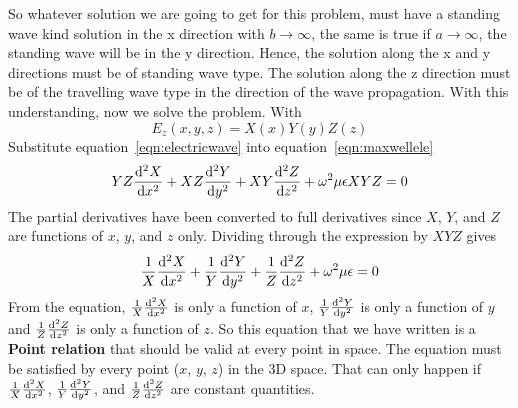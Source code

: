 So whatever solution we are going to get for this problem, must have a standing wave kind solution in the x direction with $b\rightarrow \infty$, the same is true if $a\rightarrow \infty$, the standing wave will be in the y direction. Hence, the solution along the x and y directions must be of standing wave type. The solution along the z direction must be of the travelling wave type in the direction of the wave propagation. With this understanding, now we solve the problem. With
\begin{equation}
E_z (x,y,z) = X(x)Y(y)Z(z)
\label{eqn:electricwave}
\end{equation}
Substitute equation~\ref{eqn:electricwave} into equation~\ref{eqn:maxwellele}
\begin{align}
YZ \dv[2]{X}{x} + XZ \dv[2]{Y}{y} + XY \dv[2]{Z}{z}+ \omega^2\mu\epsilon {XYZ} = 0
\end{align}
The partial derivatives have been converted to full derivatives since $X$, $Y$, and $Z$ are functions of $x$, $y$, and $z$ only. Dividing through the expression by $XYZ$ gives
\begin{align}
\frac{1}{X}\dv[2] {X}{x} + \frac{1}{Y}\dv[2]{Y}{y} + \frac{1}{Z} \dv[2]{Z}{z} + \omega^2\mu\epsilon = 0
\label{eqn:diffeqn}
\end{align}
From the equation, $\frac{1}{X}\dv[2] {X}{x}$ is only a function of $x$, $\frac{1}{Y}\dv[2]{Y}{y}$ is only a function of $y$ and $\frac{1}{Z} \dv[2]{Z}{z}$ is only a function of $z$. So this equation that we have written is a \textbf{Point relation} that should be valid at every point in space. The equation must be satisfied by every point ($x$, $y$, $z$) in the 3D space. That can only happen if $\frac{1}{X}\dv[2] {X}{x}$, $\frac{1}{Y}\dv[2]{Y}{y}$, and $\frac{1}{Z} \dv[2]{Z}{z}$ are constant quantities.

